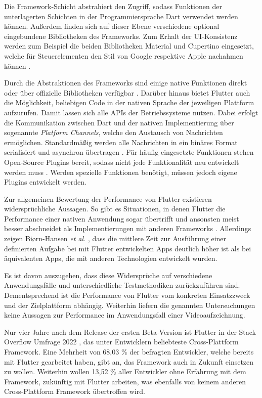 Die Framework-Schicht abstrahiert den Zugriff, sodass Funktionen der unterlagerten Schichten in der Programmiersprache Dart verwendet werden können.
Außerdem finden sich auf dieser Ebene verschiedene optional eingebundene Bibliotheken des Frameworks.
Zum Erhalt der \ac{UI}-Konsistenz werden zum Beispiel die beiden Bibliotheken Material und Cupertino eingesetzt, welche für Steuerelementen den Stil von Google respektive Apple nachahmen können \cite{Manchanda_CrossPlatformFrameworks, Flutter_Architektur}.


Durch die Abstraktionen des Frameworks sind einige native Funktionen direkt oder über offizielle Bibliotheken verfügbar \cite{Dart_Overview}.
Darüber hinaus bietet Flutter auch die Möglichkeit, beliebigen Code in der nativen Sprache der jeweiligen Plattform aufzurufen.
Damit lassen sich alle \acp{API} der Betriebssysteme nutzen.
Dabei erfolgt die Kommunikation zwischen Dart und der nativen Implementierung über sogenannte \textit{Platform Channels}, welche den Austausch von Nachrichten ermöglichen.
Standardmäßig werden alle Nachrichten in ein binäres Format serialisiert und asynchron übertragen \cite{Flutter_PlatfromChannels}.
Für häufig eingesetzte Funktionen stehen Open-Source Plugins bereit, sodass nicht jede Funktionalität neu entwickelt werden muss \cite{Flutter_Architektur}.
Werden spezielle Funktionen benötigt, müssen jedoch eigene Plugins entwickelt werden.


Zur allgemeinen Bewertung der Performance von Flutter existieren widersprüchliche Aussagen.
So gibt es Situationen, in denen Flutter die Performance einer nativen Anwendung sogar übertrifft und ansonsten meist besser abschneidet als Implementierungen mit anderen Frameworks \cite{Nawrocki_Comparison_Hybrid_Native_Frameworks}.
Allerdings zeigen Bi{\o}rn-Hansen \textit{et al.} \cite{Biorn-Hansen_PerformanceOverhead_CrossPlatform}, dass die mittlere Zeit zur Ausführung einer definierten Aufgabe bei mit Flutter entwickelten Apps deutlich höher ist als bei äquivalenten Apps, die mit anderen Technologien entwickelt wurden.

Es ist davon auszugehen, dass diese Widersprüche auf verschiedene Anwendungsfälle und unterschiedliche Testmethodiken zurückzuführen sind.
Dementsprechend ist die Performance von Flutter vom konkreten Einsatzzweck und der Zielplattform abhängig.
Weiterhin liefern die genannten Untersuchungen keine Aussagen zur Performance im Anwendungsfall einer Videoaufzeichnung.

Nur vier Jahre nach dem Release der ersten Beta-Version \cite{Sharma_Flutter} ist Flutter in der Stack Overflow Umfrage 2022 \cite{Stackoverflow_2022}, das unter Entwicklern beliebteste Cross-Plattform Framework.
Eine Mehrheit von 68,03 \% der befragten Entwickler, welche bereits mit Flutter gearbeitet haben, gibt an, das Framework auch in Zukunft einsetzen zu wollen.
Weiterhin wollen 13,52 \% aller Entwickler ohne Erfahrung mit dem Framework, zukünftig mit Flutter arbeiten, was ebenfalls von keinem anderen Cross-Plattform Framework übertroffen wird.


